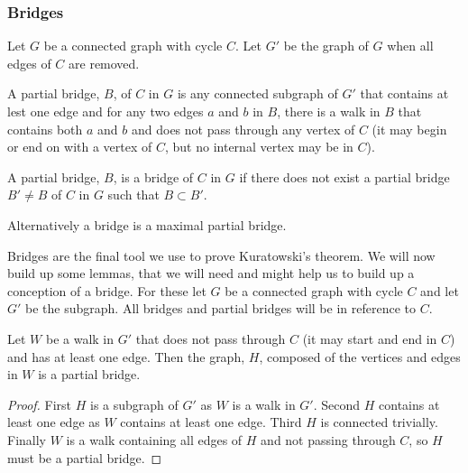 \documentclass{article}
\begin{document}
\subsubsection{Bridges}

Let $G$ be a connected graph with cycle $C$. Let $G'$ be the graph of $G$ when all edges of $C$ are removed. 
\begin{definition}
	A partial bridge, $B$, of $C$ in $G$ is any connected subgraph of $G'$ that contains at lest one edge and for any two edges $a$ and $b$ in $B$, there is a walk in $B$ that contains both $a$ and $b$ and does not pass through any vertex of $C$ (it may begin or end on with a vertex of $C$, but no internal vertex may be in $C$). 
\end{definition}
\begin{definition}[bridge]
	A partial bridge, $B$, is a bridge of $C$ in $G$ if there does not exist a partial bridge $B'\not=B$ of $C$ in $G$ such that $B\subset B'$.
	
	Alternatively a bridge is a maximal partial bridge.
\end{definition}

Bridges are the final tool we use to prove Kuratowski's theorem. We will now build up some lemmas, that we will need and might help us to build up a conception of a bridge. For these let $G$ be a connected graph with cycle $C$ and let $G'$ be the subgraph. All bridges and partial bridges will be in reference to $C$.


\begin{lemma}\label{walktopartialbridge}
	Let $W$ be a walk in $G'$ that does not pass through $C$ (it may start and end in $C$) and has at least one edge. Then the graph, $H$, composed of the vertices and edges in $W$ is a partial bridge.
\end{lemma}
\begin{proof}
	First $H$ is a subgraph of $G'$ as $W$ is a walk in $G'$. Second $H$ contains at least one edge as $W$ contains at least one edge. Third $H$ is connected trivially. Finally $W$ is a walk containing all edges of $H$ and not passing through $C$, so $H$ must be a partial bridge.
\end{proof}
\end{document}
